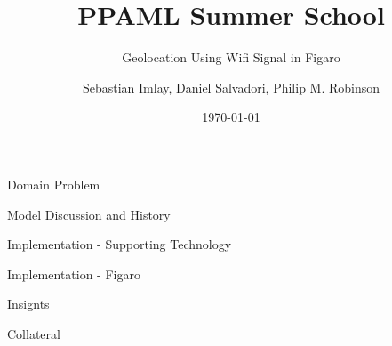 \documentclass[dvips,11pt]{beamer}
\begin{document}
\title{PPAML Summer School}

\subtitle{Geolocation Using Wifi Signal in Figaro}

\author{Sebastian Imlay, Daniel Salvadori, Philip M. Robinson}


\date{\today}

\begin{frame}
  \titlepage
\end{frame}


\begin{frame}{Domain Problem}

\end{frame}

\begin{frame}{Model Discussion and History}

\end{frame}

\begin{frame}{Implementation - Supporting Technology}

\end{frame}

\begin{frame}{Implementation - Figaro}

\end{frame}

\begin{frame}{Insignts}

\end{frame}

\begin{frame}{Collateral}

\end{frame}
\end{document}
